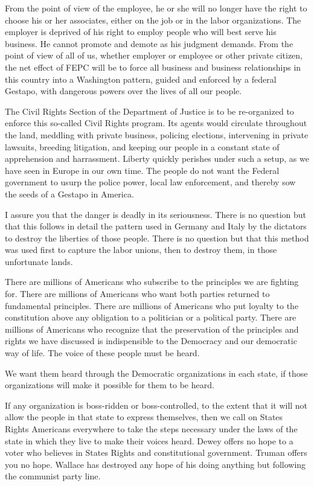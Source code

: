 \documentclass[10pt,a4paper]{article}
\begin{document}
From the point of view of the employee, he or she will no longer have the right to choose his or her associates, either on the job or in the labor organizations. The employer is deprived of his right to employ people who will best serve his business. He cannot promote and demote as his judgment demands. From the point of view of all of us, whether employer or employee or other private citizen, the net effect of FEPC will be to force all business and business relationships in this country into a Washington pattern, guided and enforced by a federal Gestapo, with dangerous powers over the lives of all our people.

The Civil Rights Section of the Department of Justice is to be re-organized to enforce this so-called Civil Rights program. Its agents would circulate throughout the land, meddling with private business, policing elections, intervening in private lawsuits, breeding litigation, and keeping our people in a constant state of apprehension and harrassment. Liberty quickly perishes under such a setup, as we have seen in Europe in our own time. The people do not want the Federal government to usurp the police power, local law enforcement, and thereby sow the seeds of a Gestapo in America.

I assure you that the danger is deadly in its seriousness. There is no question but that this follows in detail the pattern used in Germany and Italy by the dictators to destroy the liberties of those people. There is no question but that this method was used first to capture the labor unions, then to destroy them, in those unfortunate lands.

There are millions of Americans who subscribe to the principles we are fighting for. There are millions of Americans who want both parties returned to fundamental principles. There are millions of Americans who put loyalty to the constitution above any obligation to a politician or a political party. There are millions of Americans who recognize that the preservation of the principles and rights we have discussed is indispensible to the Democracy and our democratic way of life. The voice of these people must be heard.

We want them heard through the Democratic organizations in each state, if those organizations will make it possible for them to be heard.

If any organization is boss-ridden or boss-controlled, to the extent that it will not allow the people in that state to express themselves, then we call on States Rights Americans everywhere to take the steps necessary under the laws of the state in which they live to make their voices heard. Dewey offers no hope to a voter who believes in States Rights and constitutional government. Truman offers you no hope. Wallace has destroyed any hope of his doing anything but following the communist party line.
\end{document}

